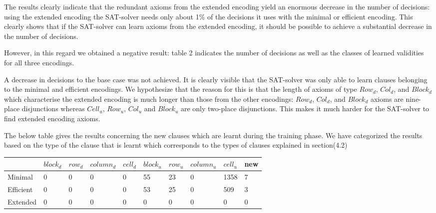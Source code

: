 \documentclass{article}
\begin{document}
The results clearly indicate that the redundant axioms from the extended encoding yield an enormous decrease in the number of decisions: using the extended encoding the SAT-solver needs only about 1\% of the decisions it uses with the minimal or efficient encoding. This clearly shows that if the SAT-solver can learn axioms from the extended encoding, it should be possible to achieve a substantial decrease in the number of decisions.

However, in this regard we obtained a negative result: table 2 indicates the number of decisions as well as the classes of learned validities for all three encodings. %

A decrease in decisions to the base case was not achieved. It is clearly visible that the SAT-solver was only able to learn clauses belonging to the minimal and efficient encodings. We hypothesize that the reason for this is that the length of axioms of type $Row_d$, $Col_d$, and $Block_d$ which characterise the extended encoding is much longer than those from the other encodings: $Row_d$, $Col_d$, and $Block_d$ axioms are nine-place disjunctions whereas $Cell_u$, $Row_u$, $Col_u$ and $Block_u$ are only two-place disjunctions. This makes it much harder for the SAT-solver to find extended encoding axioms.


\bigskip

The below table gives the results concerning the new clauses which are learnt during the training phase. We have categorized the results based on the type of the clause that is learnt which corresponds to the types of clauses explained in section(4.2)

\begin{center}
 \label{tab:title}
\begin{tabular}{ | l | l | l | l | l | l | l | l | l | l |}
	\hline
     & $block_{d}$ & $row_{d}$ & $column_{d}$ & $cell_{d}$ & $block_{u}$ & $row_{u}$ & $column_{u}$ & $cell_{u}$ & new \\ \hline
    Minimal & 0 & 0 & 0 & 0 & 55 & 23 & 0 & 1358  & 7 \\ \hline
    Efficient & 0 & 0 & 0 & 0 & 53 & 25 & 0 & 509  & 3  \\ \hline
    Extended & 0 & 0 & 0 & 0 & 0 & 0 & 0 & 0 & 0 \\
    \hline
\end{tabular}
\end{center}
\bigskip
\end{document}
